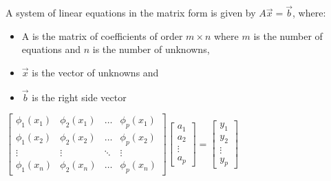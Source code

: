 \documentclass{article}
\begin{document}
\begin{multicols}{3}
A system of linear equations in the matrix form is given by $A\vec{x} = \vec{b}$,
where:
\begin{itemize}
    \setlength\itemsep{0.1em}
    \item A is the matrix of coefficients of order $m \times n$ where $m$ is the number of equations
        and $n$ is the number of unknowns,
    \item $\vec{x}$ is the vector of unknowns and
    \item $\vec{b}$ is the right side vector
\end{itemize}
\begin{small}
    \begin{center}
        \begin{math}
        \begin{bmatrix}
            \phi_1(x_1) & \phi_2(x_1) & \dots  & \phi_p(x_1) \\
            \phi_1(x_2) & \phi_2(x_2) & \dots  & \phi_p(x_2) \\
            \vdots & \vdots & \ddots & \vdots \\
            \phi_1(x_n) & \phi_2(x_n) & \dots  & \phi_p(x_n)
        \end{bmatrix}
        \begin{bmatrix}
             a_1 \\
             a_2 \\
             \vdots \\
             a_p
        \end{bmatrix} = 
        \begin{bmatrix}
             y_1 \\
             y_2 \\
             \vdots \\
             y_p
        \end{bmatrix}
        \end{math}
    \end{center}
\end{small}


\end{multicols}
\end{document}
